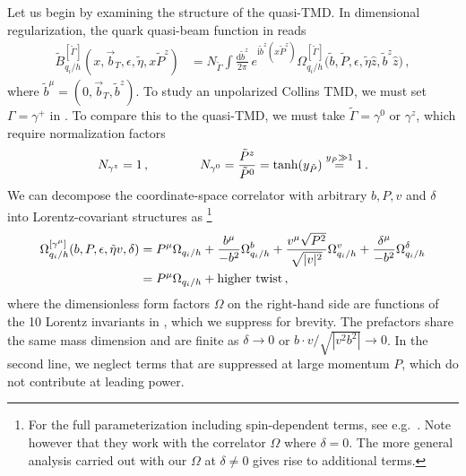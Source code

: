 \documentclass[11pt,a4paper]{article}
\newcommand{\df}{\mathrm{d}}
\newcommand{\img}{\mathrm{i}}
\newcommand{\eps}{\epsilon}
\newcommand{\nn}{\nonumber}
\newcommand{\bt}{\vec b_T}
\newcommand{\Corr}{\Omega}
\newcommand{\q}{q_i}
\begin{document}
Let us begin by examining the structure of the quasi-TMD. 
In dimensional regularization, the quark quasi-beam function in  reads
\begin{align} \label{eq:qbeam_2}
	\tilde B_{\q/h}^{[\tilde\Gamma]}(x, \bt, \eps, \tilde\eta, x \tilde P^z) &
	= N_{\tilde\Gamma}  \int\frac{\df \tilde b^z}{2\pi} \, e^{\img \tilde b^z (x \tilde P^z)}
	\Corr_{\q/h}^{[\tilde\Gamma]} \bigl(\tilde b, \tilde P, \eps,  \tilde \eta \hat z, \tilde b^z \hat{z} \bigr)
	\,,\end{align}
where $\tilde b^\mu = (0, \bt, \tilde b^z)$.
To study an unpolarized Collins TMD, we must set $\Gamma=\gamma^+$ in .
To compare this to the quasi-TMD, we must take $\tilde \Gamma = \gamma^0$ or  $\gamma^z$, which require normalization factors
\begin{align}
	N_{\gamma^z} =1 \,,\qquad \qquad N_{\gamma^0} = {\tilde P^z\over \tilde P^0} = \tanh( y_{\tilde P}) \stackrel{ y_{\tilde P} \gg 1}{=} 1
	\,.\end{align}
We can decompose the coordinate-space correlator with arbitrary $b,P,v$ and $\delta$ into Lorentz-covariant structures as%
\footnote{For the full parameterization including spin-dependent terms, see e.g.~.
	Note however that they work with the correlator $\Corr$ where $\delta = 0$. The more general analysis carried out with our $\Corr$ at $\delta \neq 0$ gives rise to additional terms.}
\begin{align} \label{eq:correlator_decomposition}
	\Corr_{\q/h}^{[\gamma^\mu]} (b,P,\eps, \tilde\eta v,\delta) &
	= P^\mu \Corr_{\q/h}
	+ {b^\mu\over -b^2} \Corr_{\q/h}^b
	+ { v^\mu \sqrt{P^2} \over \sqrt{ | v|^2}} \Corr_{\q/h}^v
	+ {\delta^\mu\over -b^2} \Corr_{\q/h}^\delta
	\nn\\&
	= P^\mu \Corr_{\q/h} + \mathrm{higher~twist}
	\,,\end{align}
where the dimensionless form factors $\Corr$ on the right-hand side are functions of the 10 Lorentz invariants in ,
which we suppress for brevity. The prefactors share the same mass dimension and are finite as $\delta\to0$
or $b \cdot v /\sqrt{|v^2 b^2|} \to 0$.
In the second line, we neglect terms that are suppressed at large momentum $P$,
which do not contribute at leading power.
\end{document}
